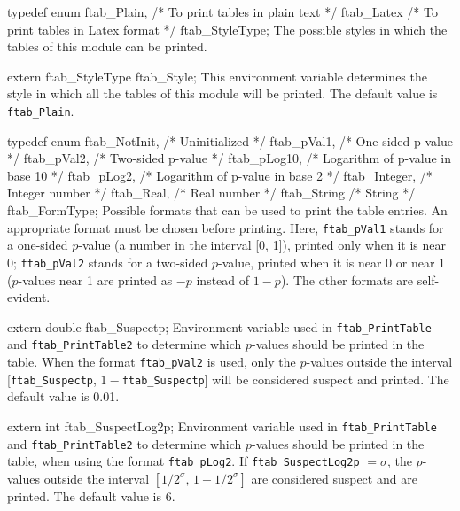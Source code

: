 \code

typedef enum {
   ftab_Plain,                /* To print tables in plain text */
   ftab_Latex                 /* To print tables in Latex format */
} ftab_StyleType;
\endcode
 \tab The possible styles in which the tables of this module can be printed.
\endtab
\code


extern ftab_StyleType ftab_Style;
\endcode
\tab This environment variable determines the style in which all the tables
  of this module will be printed. The default value is {\tt ftab\_Plain}.
\endtab
\mycode


typedef enum {
   ftab_NotInit,              /* Uninitialized */
   ftab_pVal1,                /* One-sided p-value */
   ftab_pVal2,                /* Two-sided p-value */
   ftab_pLog10,               /* Logarithm of p-value in base 10 */
   ftab_pLog2,                /* Logarithm of p-value in base 2 */
   ftab_Integer,              /* Integer number */
   ftab_Real,                 /* Real number */
   ftab_String                /* String */
} ftab_FormType;
\myendcode
 \tab Possible formats that can be used to print the table entries.
  An appropriate format must be chosen before printing.
  Here, {\tt ftab\_pVal1}
  stands for a one-sided $p$-value (a number in the interval [0, 1]), 
  printed only when it is near 0; {\tt ftab\_pVal2}  stands for a
  two-sided $p$-value, printed  when it is near 0 or near 1
  ($p$-values near 1 are printed as $-p$ instead of $1 -p$).
  The other formats are self-evident.
 \endtab
\code


extern double ftab_Suspectp;
\endcode
 \tab  Environment variable 
   used in {\tt ftab\_PrintTable} and  {\tt ftab\_PrintTable2} to determine
   which $p$-values should be printed in the table.
   When the format {\tt ftab\_pVal2} is used, only the
   $p$-values outside the interval [{\tt ftab\_Suspectp},
    $1 - {}${\tt ftab\_Suspectp}] will be considered suspect and printed.
   The default value is 0.01. 
 \endtab
\code


extern int ftab_SuspectLog2p;
\endcode
 \tab  Environment variable used in {\tt ftab\_PrintTable}  and 
   {\tt ftab\_PrintTable2}  to determine which $p$-values should be printed
   in the table, when using the format {\tt ftab\_pLog2}.
   If {\tt ftab\_SuspectLog2p} $= \sigma$, the $p$-values
   outside the interval $[1/{2^\sigma},\, 1-1/{2^\sigma}]$ are
   considered suspect and are printed.
   The default value is 6.
 \endtab
\code


